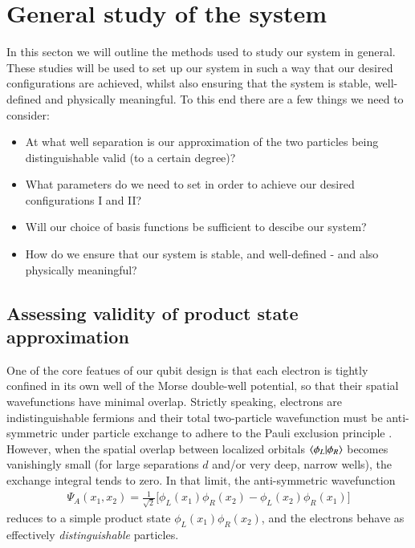 \documentclass{subfiles}
\begin{document}
\section{General study of the system}
In this secton we will outline the methods used to study our system in general. These studies will be used to set up our system in such a way that our desired configurations are achieved, whilst also ensuring that the system is stable, well-defined and physically meaningful. To this end there are a few things we need to consider:
\begin{itemize}
    \item At what well separation is our approximation of the two particles being distinguishable valid (to a certain degree)?
    \item What parameters do we need to set in order to achieve our desired configurations I and II?
    \item Will our choice of basis functions be sufficient to descibe our system?
    \item How do we ensure that our system is stable, and well-defined - and also physically meaningful?
\end{itemize}
\subsection{Assessing validity of product state approximation}\label{sec:distinguishability} %
One of the core featues of our qubit design is that each electron is tightly confined in its own well of the Morse double-well potential, so that their spatial wavefunctions have minimal overlap. Strictly speaking, electrons are indistinguishable fermions and their total two-particle wavefunction must be anti-symmetric under particle exchange to adhere to the Pauli exclusion principle \cite{berera2021quantum, griffiths2018introduction}. However, when the spatial overlap between localized orbitals $\braket{\phi_L|\phi_R}$  becomes vanishingly small (for large separations $d$ and/or very deep, narrow wells), the exchange integral tends to zero. In that limit, the anti-symmetric wavefunction
\begin{align*}
    \Psi_A(x_1, x_2) = \frac{1}{\sqrt{2}} \bigg[\phi_L(x_1)\phi_R(x_2) - \phi_L(x_2)\phi_R(x_1)\bigg]
\end{align*}
reduces to a simple product state $\phi_L(x_1)\phi_R(x_2)$, and the electrons behave as effectively \emph{distinguishable} particles. 
\end{document}
